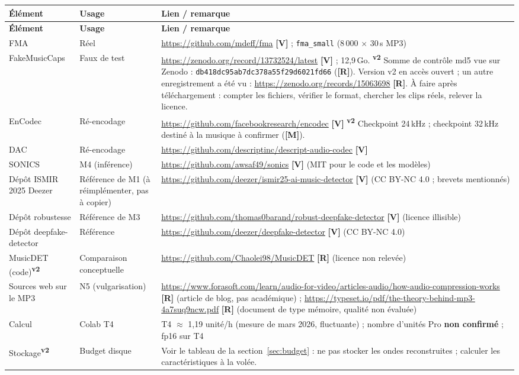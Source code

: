 \documentclass[11pt,a4paper]{article}
\newcommand{\vtwo}{\textsuperscript{\textcolor{orange!80!black}{\textbf{v2}}}}
\newcommand{\lV}{\textbf{\textcolor{green!45!black}{[V]}}}
\newcommand{\lR}{\textbf{\textcolor{orange!80!black}{[R]}}}
\newcommand{\lM}{\textbf{\textcolor{red!70!black}{[M]}}}
\begin{document}
{\footnotesize
\begin{longtable}{L{2.6cm}L{3.0cm}L{9.7cm}}
\toprule
\textbf{Élément} & \textbf{Usage} & \textbf{Lien / remarque}\\
\midrule
\endfirsthead
\toprule
\textbf{Élément} & \textbf{Usage} & \textbf{Lien / remarque}\\
\midrule
\endhead
\bottomrule
\endfoot
FMA & Réel & \url{https://github.com/mdeff/fma} \lV{} ; \texttt{fma\_small} (8\,000 $\times$ 30\,s MP3)\\
\addlinespace
FakeMusicCaps & Faux de test & \url{https://zenodo.org/record/13732524/latest} \lV{} ; 12,9\,Go. \vtwo{} Somme de contrôle md5 vue sur Zenodo : \texttt{db418dc95ab7dc378a55f29d6021fd66} (\lR). Version v2 en accès ouvert ; un autre enregistrement a été vu : \url{https://zenodo.org/records/15063698} \lR. À faire après téléchargement : compter les fichiers, vérifier le format, chercher les clips réels, relever la licence.\\
\addlinespace
EnCodec & Ré-encodage & \url{https://github.com/facebookresearch/encodec} \lV{} \vtwo{} Checkpoint 24\,kHz ; checkpoint 32\,kHz destiné à la musique à confirmer (\lM).\\
\addlinespace
DAC & Ré-encodage & \url{https://github.com/descriptinc/descript-audio-codec} \lV\\
\addlinespace
SONICS & M4 (inférence) & \url{https://github.com/awsaf49/sonics} \lV{} (MIT pour le code et les modèles)\\
\addlinespace
Dépôt ISMIR 2025 Deezer & Référence de M1 (à réimplémenter, pas à copier) & \url{https://github.com/deezer/ismir25-ai-music-detector} \lV{} (CC BY-NC 4.0 ; brevets mentionnés)\\
\addlinespace
Dépôt robustesse & Référence de M3 & \url{https://github.com/thomas0barand/robust-deepfake-detector} \lV{} (licence illisible)\\
\addlinespace
Dépôt deepfake-detector & Référence & \url{https://github.com/deezer/deepfake-detector} \lV{} (CC BY-NC 4.0)\\
\addlinespace
MusicDET (code)\vtwo & Comparaison conceptuelle & \url{https://github.com/Chaolei98/MusicDET} \lR{} (licence non relevée)\\
\addlinespace
Sources web sur le MP3 & N5 (vulgarisation) & \url{https://www.forasoft.com/learn/audio-for-video/articles-audio/how-audio-compression-works} \lR{} (article de blog, pas académique) ; \url{https://typeset.io/pdf/the-theory-behind-mp3-4a7suq9ncw.pdf} \lR{} (document de type mémoire, qualité non évaluée)\\
\addlinespace
Calcul & Colab T4 & T4 $\approx$ 1,19 unité/h (mesure de mars 2026, fluctuante) ; nombre d'unités Pro \textbf{non confirmé} ; fp16 sur T4\\
\addlinespace
Stockage\vtwo & Budget disque & Voir le tableau de la section~\ref{sec:budget} : ne pas stocker les ondes reconstruites ; calculer les caractéristiques à la volée.\\
\end{longtable}}
\end{document}
